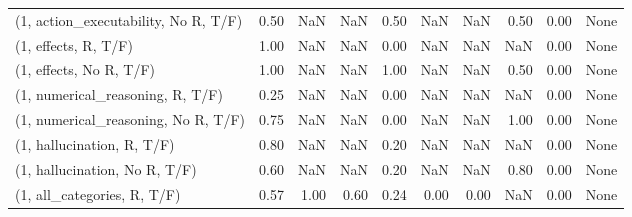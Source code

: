 \begin{table*}[h!]
\begin{adjustbox}{width=2\columnwidth,center}
\begin{tabular}{lrrr|rrr|rrr}
(1, action\_executability, No R, T/F) &                      0.50 &                   NaN &                       NaN &                          0.50 &                       NaN &                           NaN &                                   0.50 &                               0.00 &                                  None \\
(1, effects, R, T/F)                 &                      1.00 &                   NaN &                       NaN &                          0.00 &                       NaN &                           NaN &                                    NaN &                               0.00 &                                  None \\
(1, effects, No R, T/F)              &                      1.00 &                   NaN &                       NaN &                          1.00 &                       NaN &                           NaN &                                   0.50 &                               0.00 &                                  None \\
(1, numerical\_reasoning, R, T/F)     &                      0.25 &                   NaN &                       NaN &                          0.00 &                       NaN &                           NaN &                                    NaN &                               0.00 &                                  None \\
(1, numerical\_reasoning, No R, T/F)  &                      0.75 &                   NaN &                       NaN &                          0.00 &                       NaN &                           NaN &                                   1.00 &                               0.00 &                                  None \\
(1, hallucination, R, T/F)           &                      0.80 &                   NaN &                       NaN &                          0.20 &                       NaN &                           NaN &                                    NaN &                               0.00 &                                  None \\
(1, hallucination, No R, T/F)        &                      0.60 &                   NaN &                       NaN &                          0.20 &                       NaN &                           NaN &                                   0.80 &                               0.00 &                                  None \\
(1, all\_categories, R, T/F)          &                      0.57 &                  1.00 &                      0.60 &                          0.24 &                      0.00 &                          0.00 &                                    NaN &                               0.00 &                                  None \\

\end{tabular}
\end{adjustbox}
\end{table*}

